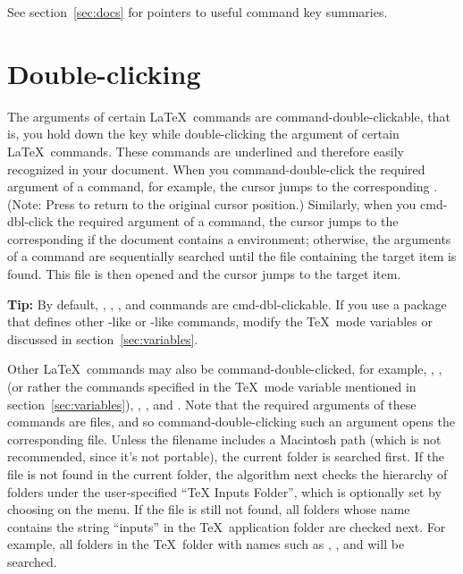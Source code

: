 \documentclass{report}
\begin{document}
See section~\ref{sec:docs} for pointers to useful command key summaries.

\section{Double-clicking}
\label{sec:dblClicking}

The arguments of certain \LaTeX\ commands are 
command-double-clickable, that is, you hold down the  key 
while double-clicking the argument of certain \LaTeX\ commands.  
These commands are underlined and therefore easily recognized in 
your document.  When you command-double-click the required argument 
of a  command, for example, the cursor jumps to the 
corresponding .  (Note: Press  to return to 
the original cursor position.)  Similarly, when you cmd-dbl-click 
the required argument of a  command, the cursor jumps to 
the corresponding  if the document contains a 
 environment; otherwise, the arguments of a 
 command are sequentially searched until the 
 file containing the target item is found.  This 
 file is then opened and the cursor jumps to the 
target item.

\textbf{Tip:} By default, , , , and 
 commands are cmd-dbl-clickable.  If you use a package 
that defines other -like or -like commands, modify 
the \TeX\ mode variables  or  
discussed in section~\ref{sec:variables}.

Other \LaTeX\ commands may also be command-double-clicked, for 
example, , ,  (or rather 
the commands specified in the \TeX\ mode variable  
mentioned in section~\ref{sec:variables}), , 
, and .  Note that the required 
arguments of these commands are files, and so command-double-clicking 
such an argument opens the corresponding file.  Unless the filename 
includes a Macintosh path (which is not recommended, since it's not 
portable), the current folder is searched first.  If the file is not 
found in the current folder, the algorithm next checks the hierarchy 
of folders under the user-specified ``TeX Inputs Folder'', which is 
optionally set by choosing  on the  menu.  
If the file is still not found, all folders whose name contains the 
string ``inputs'' in the \TeX\ application folder are checked next.  
For example, all folders in the \TeX\ folder with names such as 
, , and 
 will be searched.
\end{document}

